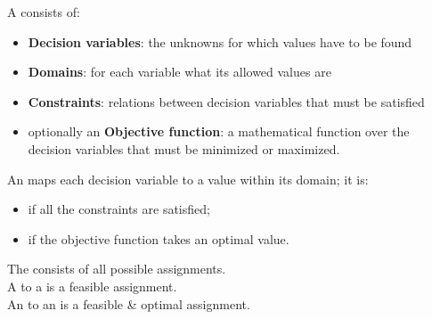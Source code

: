 \documentclass{cons-beamer}
\begin{document}
\begin{frame}
  \begin{definitions}
    A  consists of:
    \begin{itemize}
      \item \textbf{Decision variables}: the unknowns for which values have to be found
      \item \textbf{Domains}: for each variable what its allowed values are
      \item \textbf{Constraints}: relations between decision variables that must be satisfied
      \item optionally an \textbf{Objective function}: a mathematical function over the decision variables that must be minimized or maximized.
    \end{itemize}
  \end{definitions}
  
  \begin{definitions}
    An  maps each decision variable to a value within its domain; it is:
    \begin{itemize}
      \item {} if all the constraints are satisfied;
      \item {} if the objective function takes an optimal value.
    \end{itemize}
    The  consists of all possible assignments. \\
    A  to a  is a feasible assignment. \\
    An  to an  is a feasible \& optimal assignment.
  \end{definitions}
\end{frame}
\end{document}
